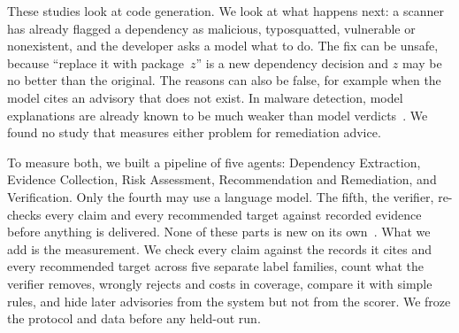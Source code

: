 \documentclass[conference]{IEEEtran}
\begin{document}
These studies look at code generation. We look at what happens next: a scanner has already flagged a dependency as malicious, typosquatted, vulnerable or nonexistent, and the developer asks a model
what to do. The fix can be unsafe, because ``replace it with package~$z$'' is a new
dependency decision and $z$ may be no better than the original. The reasons can also be false, for example when the
model cites an advisory that does not exist. In malware detection, model explanations are already known to be much
weaker than model verdicts~\cite{ryan2026}. We found no study that measures either problem for remediation advice.

To measure both, we built a pipeline of five agents: Dependency Extraction, Evidence Collection, Risk Assessment,
Recommendation and Remediation, and Verification. Only the fourth may use a language model. The fifth, the verifier,
re-checks every claim and every recommended target against recorded evidence before anything is delivered. None of these
parts is new on its own~\cite{zeshan2026,toda2025,zahan2025,lewis2020,dhuliawala2024}. What we add is the
measurement. We check every claim against the records it cites and every recommended target across five separate
label families, count what the verifier removes, wrongly rejects and costs in coverage, compare it with simple
rules, and hide later advisories from the system but not from the scorer. We froze the protocol and data before any held-out run.
\end{document}

